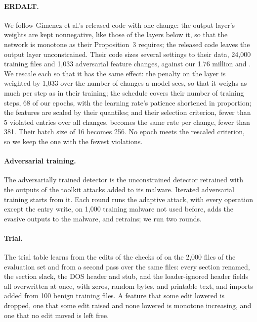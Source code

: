 \paragraph{ERDALT.} We follow Gimenez et al.'s released code with one change: the output layer's weights are kept
nonnegative, like those of the layers below it, so that the network is monotone as their Proposition~3 requires; the
released code leaves the output layer unconstrained. Their code sizes several settings to their data, 24,000 training
files and 1,033 adversarial feature changes, against our 1.76 million and . We rescale each so
that it has the same effect: the penalty on the layer is weighted by 1,033 over the number of changes a model sees,
so that it weighs as much per step as in their training; the schedule covers their number of training steps, 68 of our
epochs, with the learning rate's patience shortened in proportion; the features are scaled by their quantiles; and
their selection criterion, fewer than 5 violated entries over all changes, becomes the same rate per change, fewer than
381. Their batch size of 16 becomes 256. No epoch meets the rescaled criterion, so we keep the one with the fewest
violations.

\paragraph{Adversarial training.} The adversarially trained detector is the unconstrained detector retrained with the
outputs of the toolkit attacks added to its malware. Iterated adversarial training starts from it. Each round runs
the adaptive attack, with every operation except the entry write, on 1,000 training malware not used before, adds the
evasive outputs to the malware, and retrains; we run two rounds.

\paragraph{Trial.} The trial table learns from the edits of the checks of  on the 2,000 files of
the evaluation set and from a second pass over the same files: every section renamed, the section slack, the DOS
header and stub, and the loader-ignored header fields all overwritten at once, with zeros, random bytes, and printable
text, and imports added from 100 benign training files. A feature that some edit lowered is dropped, one that some
edit raised and none lowered is monotone increasing, and one that no edit moved is left free.

